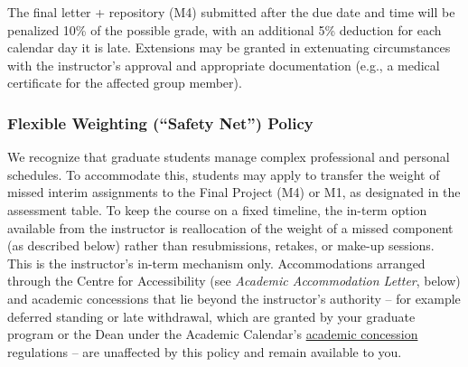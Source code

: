 \documentclass[
]{article}
\begin{document}
The final letter + repository (M4) submitted after the due date and time
will be penalized 10\% of the possible grade, with an additional 5\%
deduction for each calendar day it is late. Extensions may be granted in
extenuating circumstances with the instructor's approval and appropriate
documentation (e.g., a medical certificate for the affected group
member).

\subsubsection{Flexible Weighting (``Safety Net'')
Policy}\label{flexible-weighting-safety-net-policy}

We recognize that graduate students manage complex professional and
personal schedules. To accommodate this, students may apply to transfer
the weight of missed interim assignments to the Final Project (M4) or
M1, as designated in the assessment table. To keep the course on a fixed
timeline, the in-term option available from the instructor is
reallocation of the weight of a missed component (as described below)
rather than resubmissions, retakes, or make-up sessions. This is the
instructor's in-term mechanism only. Accommodations arranged through the
Centre for Accessibility (see \emph{Academic Accommodation Letter},
below) and academic concessions that lie beyond the instructor's
authority -- for example deferred standing or late withdrawal, which are
granted by your graduate program or the Dean under the Academic
Calendar's
\href{https://vancouver.calendar.ubc.ca/campus-wide-policies-and-regulations/academic-concession}{academic
concession} regulations -- are unaffected by this policy and remain
available to you.
\end{document}
